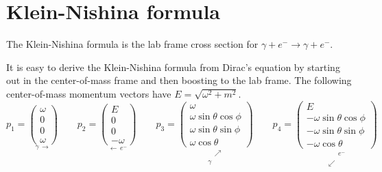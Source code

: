 

\section*{Klein-Nishina formula}

The Klein-Nishina formula is the lab frame cross section for
$\gamma+e^-\rightarrow\gamma+e^-$.

\begin{center}
\end{center}

It is easy to derive the Klein-Nishina formula from Dirac's equation by starting
out in the center-of-mass frame and then boosting to the lab frame.
The following center-of-mass momentum vectors have $E=\sqrt{\omega^2+m^2}$.
\begin{equation*}
p_1=\underset{\gamma \, \longrightarrow}
{\begin{pmatrix}\omega\\0\\0\\ \omega\end{pmatrix}}
\qquad
p_2=\underset{\longleftarrow \, e^-}
{\begin{pmatrix}E\\0\\0\\-\omega\end{pmatrix}}
\qquad
p_3=\underset{\substack{\phantom{\gamma} \, \nearrow\\\gamma \, \phantom{\nearrow}}}
{\begin{pmatrix}
\omega\\
\omega\sin\theta\cos\phi\\
\omega\sin\theta\sin\phi\\
\omega\cos\theta
\end{pmatrix}}
\qquad
p_4=\underset{\substack{\phantom{\swarrow} \, e^-\\\swarrow \, \phantom{e^-}}}
{\begin{pmatrix}
E\\
-\omega\sin\theta\cos\phi\\
-\omega\sin\theta\sin\phi\\
-\omega\cos\theta
\end{pmatrix}}
\end{equation*}

